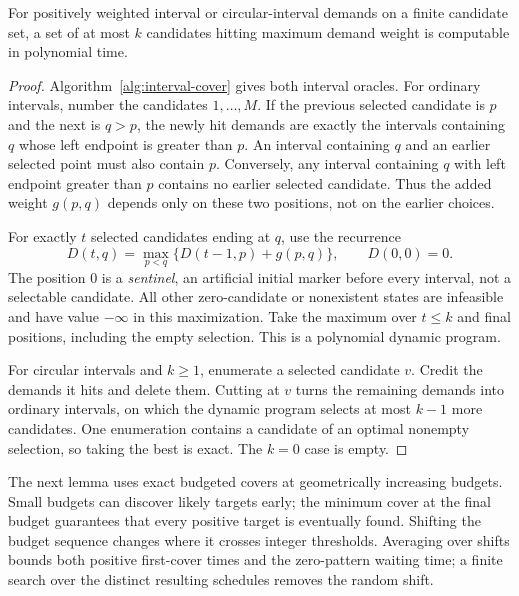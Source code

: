 \begin{lemma}\label{lem:budget-coverage}
For positively weighted interval or circular-interval demands on
a finite candidate set, a set of at most $k$ candidates hitting
maximum demand weight is computable in polynomial time.
\end{lemma}
\begin{proof}
Algorithm~\ref{alg:interval-cover} gives both interval oracles.
For ordinary intervals, number the candidates $1,\ldots,M$.
If the previous selected candidate is $p$ and the next is $q>p$,
the newly hit demands are exactly the intervals containing $q$
whose left endpoint is greater than $p$. An interval containing
$q$ and an earlier selected point must also contain $p$.
Conversely, any interval containing $q$ with left endpoint greater
than $p$ contains no earlier selected candidate. Thus the added
weight $g(p,q)$ depends only on these two positions, not on the
earlier choices.

For exactly $t$ selected candidates ending at $q$, use the recurrence
\[
 D(t,q)=\max_{p<q}\{D(t-1,p)+g(p,q)\},
 \qquad D(0,0)=0.
\]
The position $0$ is a \emph{sentinel}, an artificial initial marker
before every interval, not a selectable candidate.
All other zero-candidate or nonexistent states are infeasible
and have value $-\infty$ in this maximization.
Take the maximum over
$t\le k$ and final positions, including the empty selection.
This is a polynomial dynamic program.

For circular intervals and $k\ge1$, enumerate a selected candidate
$v$. Credit the demands it hits and delete them. Cutting at $v$
turns the remaining demands into ordinary intervals, on which
the dynamic program selects at most $k-1$ more candidates.
One enumeration contains a candidate of an optimal nonempty
selection, so taking the best is exact. The $k=0$ case is empty.
\end{proof}



The next lemma uses exact budgeted covers at geometrically
increasing budgets. Small budgets can discover likely targets early;
the minimum cover at the final budget guarantees that every positive
target is eventually found. Shifting the budget sequence changes
where it crosses integer thresholds. Averaging over shifts bounds
both positive first-cover times and the zero-pattern waiting time;
a finite search over the distinct resulting schedules removes the
random shift.

